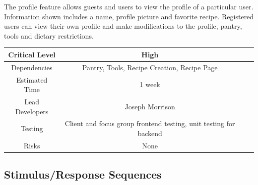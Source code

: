 \documentclass{scrreprt}
\begin{document}
The profile feature allows guests and users to view the profile of a particular user. Information shown includes a name, profile picture and favorite recipe. Registered users can view their own profile and make modifications to the profile, pantry, tools and dietary restrictions.

\begin{center}
    \begin{tabular}{| c | c | c | c |}
        \hline
        Critical Level  & High                                                                 \\
        \hline
        Dependencies    & Pantry, Tools, Recipe Creation, Recipe Page                          \\
        \hline
        Estimated Time  & 1 week                                                               \\
        \hline
        Lead Developers & Joseph Morrison \\
        \hline
        Testing         & Client and focus group \gls{frontend} testing,
                          \gls{unit testing} for \gls{backend}                                 \\
        \hline
        Risks           & None                                                                 \\
        \hline
    \end{tabular}
\end{center}

\subsection{Stimulus/Response Sequences}
\end{document}
